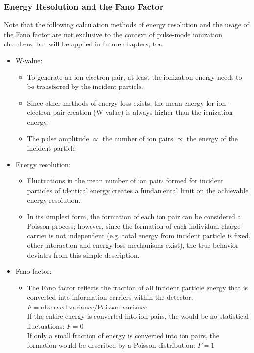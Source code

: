\subsubsection{Energy Resolution and the Fano Factor}
Note that the following calculation methods of energy resolution and the usage of the Fano factor are not exclusive to the context of pulse-mode ionization chambers, but will be applied in future chapters, too.
\begin{itemize}
    \item W-value:
    \begin{itemize}
        \item To generate an ion-electron pair, at least the ionization energy needs to be transferred by the incident particle.
        \item Since other methods of energy loss exists, the mean energy for ion-electron pair creation (W-value) is always higher than the ionization energy.
        \item The pulse amplitude $\propto$ the number of ion pairs $\propto$ the energy of the incident particle
    \end{itemize}
    \item Energy resolution:
    \begin{itemize}
        \item Fluctuations in the mean number of ion pairs formed for incident particles of identical energy creates a fundamental limit on the achievable energy resolution.
        \item In its simplest form, the formation of each ion pair can be considered a Poisson process; however, since the formation of each individual charge carrier is not independent (e.g. total energy from incident particle is fixed, other interaction and energy loss mechanisms exist), the true behavior deviates from this simple description. 
    \end{itemize}
    \item Fano factor:
    \begin{itemize}
        \item The Fano factor reflects the fraction of all incident particle energy that is converted into information carriers within the detector. \\
        $F=\text{observed variance}/\text{Poisson variance}$\\
        If the entire energy is converted into ion pairs, the would be no statistical fluctuations: $F=0$\\
        If only a small fraction of energy is converted into ion pairs, the formation would be described by a Poisson distribution: $F=1$

\end{itemize}
\end{itemize}
